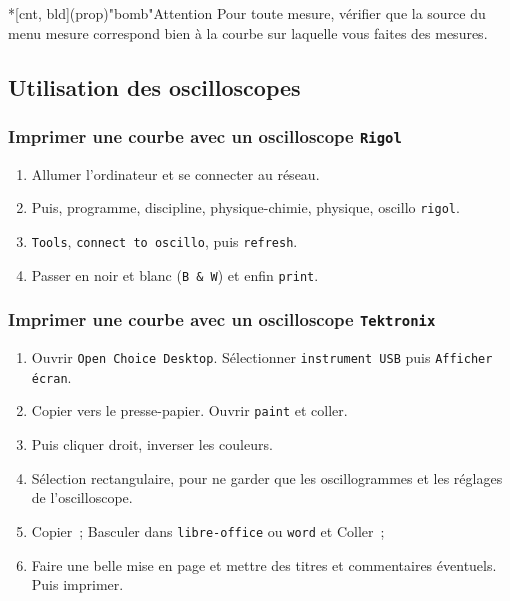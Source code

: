 \documentclass[../main/main.tex]{subfiles}
\begin{document}
\begin{tcb}*[cnt, bld](prop)"bomb"{Attention}
	Pour toute mesure, vérifier que la source du menu mesure correspond bien à
	la courbe sur laquelle vous faites des mesures.
\end{tcb}

\subsection{Utilisation des oscilloscopes}
\subsubsection{Imprimer une courbe avec un oscilloscope \texttt{Rigol}}

\begin{enumerate}
	\item Allumer l'ordinateur et se connecter au réseau.
	\item Puis, programme, discipline, physique-chimie, physique, oscillo
	      \texttt{rigol}.
	\item \texttt{Tools}, \texttt{connect to oscillo}, puis \texttt{refresh}.
	\item Passer en noir et blanc (\texttt{B \& W}) et enfin \texttt{print}.
\end{enumerate}

\subsubsection{Imprimer une courbe avec un oscilloscope \texttt{Tektronix}}

\begin{enumerate}
	\item Ouvrir \texttt{Open Choice Desktop}. Sélectionner \texttt{instrument
		      USB} puis \texttt{Afficher écran}.
	\item Copier vers le presse-papier. Ouvrir \texttt{paint} et coller.
	\item Puis cliquer droit, inverser les couleurs.
	\item Sélection rectangulaire, pour ne garder que les oscillogrammes et les
	      réglages de l'oscilloscope.
	\item Copier~; Basculer dans \texttt{libre-office} ou \texttt{word} et
	      Coller~;
	\item Faire une belle mise en page et mettre des titres et commentaires
	      éventuels. Puis imprimer.
\end{enumerate}
\end{document}
